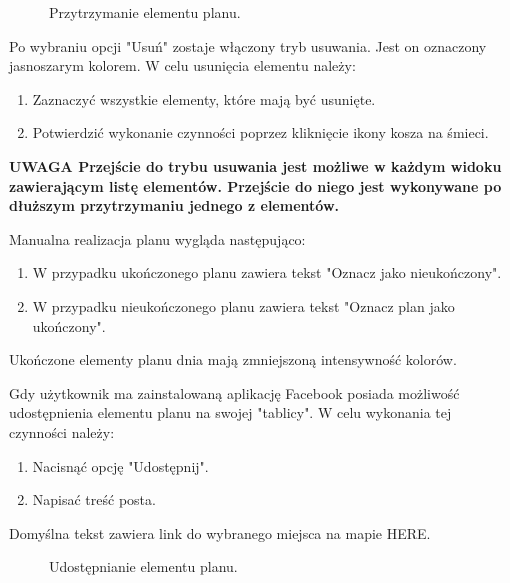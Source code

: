 \begin{figure}[h]

\centering
\null\hfill
{}
\hfill
{}
\hfill
{}
\hfill\null

\caption{Przytrzymanie elementu planu.}
\label{fig:podrecznik5}
\end{figure}
\FloatBarrier


Po wybraniu opcji "Usuń" zostaje włączony tryb usuwania.
Jest on oznaczony jasnoszarym kolorem.
W celu usunięcia elementu należy:
\begin{enumerate}
\item Zaznaczyć wszystkie elementy, które mają być usunięte.
\item Potwierdzić wykonanie czynności poprzez kliknięcie ikony kosza na śmieci.
\end{enumerate}
\textbf{UWAGA Przejście do trybu usuwania jest możliwe w każdym widoku zawierającym listę elementów. Przejście do niego jest wykonywane po dłuższym przytrzymaniu jednego z elementów.}



\par Manualna realizacja planu wygląda następująco:
\begin{enumerate}
\item W przypadku ukończonego planu zawiera tekst "Oznacz jako nieukończony".
\item W przypadku nieukończonego planu zawiera tekst "Oznacz plan jako ukończony".
\end{enumerate}
Ukończone elementy planu dnia mają zmniejszoną intensywność kolorów.


\par Gdy użytkownik ma zainstalowaną aplikację Facebook posiada możliwość udostępnienia elementu planu na swojej "tablicy". W celu wykonania tej czynności należy:
\begin{enumerate}
\item Nacisnąć opcję "Udostępnij".
\item Napisać treść posta.
\end{enumerate}
Domyślna tekst zawiera link do wybranego miejsca na mapie HERE.

\begin{figure}[h]

\centering
\null\hfill
{}
\hfill
{}
\hfill\null

\caption{Udostępnianie elementu planu.}
\label{fig:podrecznik8}
\end{figure}
\FloatBarrier

